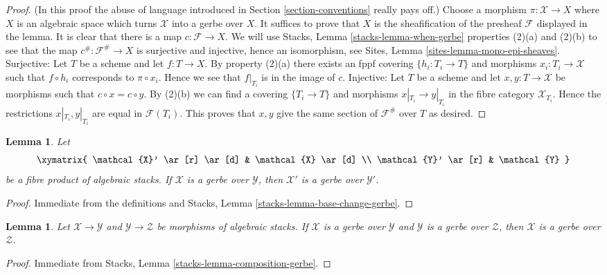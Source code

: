 \documentclass{stacks-project}
\theoremstyle{plain}
\newtheorem{lemma}[subsection]{Lemma}
\theoremstyle{definition}
\theoremstyle{remark}
\numberwithin{equation}{subsection}
\begin{document}
\begin{proof}
(In this proof the abuse of language introduced in
Section \ref{section-conventions}
really pays off.)
Choose a morphism $\pi : \mathcal{X} \to X$ where $X$ is an
algebraic space which turns $\mathcal{X}$ into a gerbe over $X$.
It suffices to prove that $X$ is the sheafification of the presheaf
$\mathcal{F}$ displayed in the lemma.
It is clear that there is a map $c : \mathcal{F} \to X$.
We will use
Stacks, Lemma \ref{stacks-lemma-when-gerbe}
properties (2)(a) and (2)(b) to see that the map $c^\# : \mathcal{F}^\# \to X$
is surjective and injective, hence an isomorphism, see
Sites, Lemma \ref{sites-lemma-mono-epi-sheaves}.
Surjective: Let $T$ be a scheme and let $f : T \to X$. By property (2)(a)
there exists an fppf covering $\{h_i : T_i \to T\}$ and morphisms
$x_i : T_i \to \mathcal{X}$ such that $f \circ h_i$ corresponds to
$\pi \circ x_i$. Hence we see that $f|_{T_i}$ is in the image of $c$.
Injective: Let $T$ be a scheme and let $x, y : T \to \mathcal{X}$
be morphisms such that $c \circ x = c \circ y$.
By (2)(b) we can find a covering $\{T_i \to T\}$ and morphisms
$x|_{T_i} \to y|_{T_i}$ in the fibre category $\mathcal{X}_{T_i}$.
Hence the restrictions $x|_{T_i}, y|_{T_i}$ are equal in
$\mathcal{F}(T_i)$. This proves that $x, y$ give the same section
of $\mathcal{F}^\#$ over $T$ as desired.
\end{proof}

\begin{lemma}
\label{lemma-base-change-gerbe}
Let
$$
\xymatrix{
\mathcal{X}' \ar[r] \ar[d] & \mathcal{X} \ar[d] \\
\mathcal{Y}' \ar[r] & \mathcal{Y}
}
$$
be a fibre product of algebraic stacks.
If $\mathcal{X}$ is a gerbe over $\mathcal{Y}$, then
$\mathcal{X}'$ is a gerbe over $\mathcal{Y}'$.
\end{lemma}

\begin{proof}
Immediate from the definitions and
Stacks, Lemma \ref{stacks-lemma-base-change-gerbe}.
\end{proof}

\begin{lemma}
\label{lemma-composition-gerbe}
Let $\mathcal{X} \to \mathcal{Y}$ and $\mathcal{Y} \to \mathcal{Z}$
be morphisms of algebraic stacks. If $\mathcal{X}$ is a gerbe over
$\mathcal{Y}$ and $\mathcal{Y}$ is a gerbe over $\mathcal{Z}$, then
$\mathcal{X}$ is a gerbe over $\mathcal{Z}$.
\end{lemma}

\begin{proof}
Immediate from
Stacks, Lemma \ref{stacks-lemma-composition-gerbe}.
\end{proof}
\end{document}
